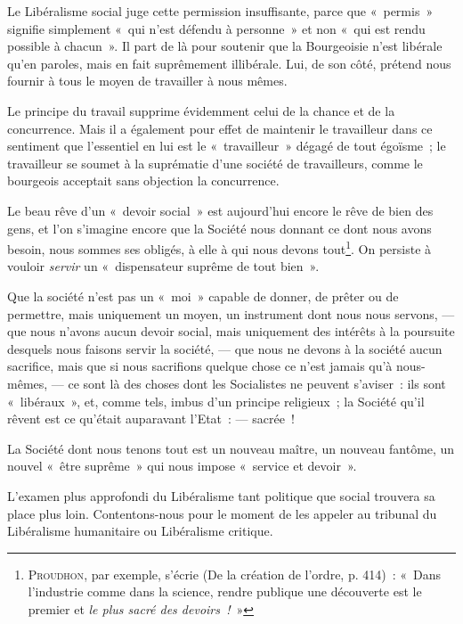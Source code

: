 \documentclass[french,twoside]{book} %
\begin{document}
Le Libéralisme social juge cette permission insuffisante, parce que « permis » signifie simplement « qui n’est défendu à personne » et non « qui est rendu  possible à chacun ». Il part de là pour soutenir que la Bourgeoisie n’est libérale qu’en paroles, mais en fait suprêmement illibérale. Lui, de son côté, prétend nous fournir à tous le moyen de travailler à nous mêmes.\par
Le principe du travail supprime évidemment celui de la chance et de la concurrence. Mais il a également pour effet de maintenir le travailleur dans ce sentiment que l’essentiel en lui est le « travailleur » dégagé de tout égoïsme ; le travailleur se soumet à la suprématie d’une société de travailleurs, comme le bourgeois acceptait sans objection la concurrence.\par
Le beau rêve d’un « devoir social » est aujourd’hui encore le rêve de bien des gens, et l’on s’imagine encore que la Société nous donnant ce dont nous avons besoin, nous sommes ses obligés, à elle à qui nous devons tout\footnote{ \noindent P{\scshape roudhon}, par exemple, s’écrie (De la création de l’ordre, p. 414) : « Dans l’industrie comme dans la science, rendre publique une découverte est le premier et \emph{le plus sacré des devoirs !} »
 }. On persiste à vouloir \emph{servir} un « dispensateur suprême de tout bien ».\par
Que la société n’est pas un « moi » capable de donner, de prêter ou de permettre, mais uniquement un moyen, un instrument dont nous nous servons, — que nous n’avons aucun devoir social, mais uniquement des intérêts à la poursuite desquels nous faisons servir la société, — que nous ne devons à la société aucun sacrifice, mais que si nous sacrifions quelque chose ce n’est jamais qu’à nous-mêmes, — ce sont là des choses dont les Socialistes ne peuvent s’aviser : ils sont « libéraux », et, comme tels, imbus d’un principe religieux ; la Société qu’il rêvent est ce qu’était auparavant l’Etat : — sacrée !\par
La Société dont nous tenons tout est un nouveau maître, un nouveau fantôme, un nouvel « être suprême » qui nous impose « service et devoir ».\par
L’examen plus approfondi du Libéralisme tant  politique que social trouvera sa place plus loin. Contentons-nous pour le moment de les appeler au tribunal du Libéralisme humanitaire ou Libéralisme critique.
\end{document}
